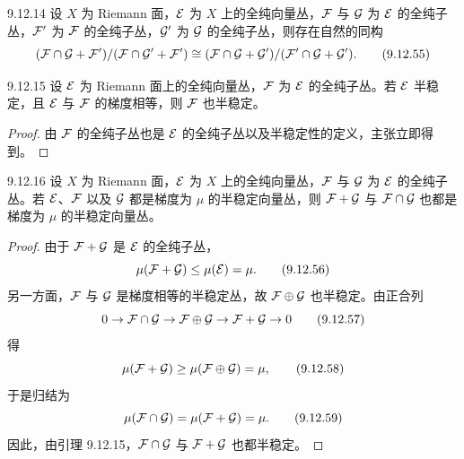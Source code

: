 \begin{corollary}{9.12.14}
  设 $X$ 为 Riemann 面，$\mathcal{E}$ 为 $X$ 上的全纯向量丛，$\mathcal{F}$ 与 $\mathcal{G}$ 为 $\mathcal{E}$ 的全纯子丛，$\mathcal{F}'$ 为 $\mathcal{F}$ 的全纯子丛，$\mathcal{G}'$ 为 $\mathcal{G}$ 的全纯子丛，则存在自然的同构
  \begin{equation}
    (\mathcal{F}\cap\mathcal{G}+\mathcal{F}')/(\mathcal{F}\cap\mathcal{G}'+\mathcal{F}')\cong(\mathcal{F}\cap\mathcal{G}+\mathcal{G}')/(\mathcal{F}'\cap\mathcal{G}+\mathcal{G}').
    \tag{9.12.55}
  \end{equation}
\end{corollary}

\begin{lemma*}{9.12.15}
  设 $\mathcal{E}$ 为 Riemann 面上的全纯向量丛，$\mathcal{F}$ 为 $\mathcal{E}$ 的全纯子丛。若 $\mathcal{E}$ 半稳定，且 $\mathcal{E}$ 与 $\mathcal{F}$ 的梯度相等，则 $\mathcal{F}$ 也半稳定。
\end{lemma*}
\begin{proof}
  由 $\mathcal{F}$ 的全纯子丛也是 $\mathcal{E}$ 的全纯子丛以及半稳定性的定义，主张立即得到。
\end{proof}

\begin{lemma*}{9.12.16}
  设 $X$ 为 Riemann 面，$\mathcal{E}$ 为 $X$ 上的全纯向量丛，$\mathcal{F}$ 与 $\mathcal{G}$ 为 $\mathcal{E}$ 的全纯子丛。若 $\mathcal{E}$、$\mathcal{F}$ 以及 $\mathcal{G}$ 都是梯度为 $\mu$ 的半稳定向量丛，则 $\mathcal{F}+\mathcal{G}$ 与 $\mathcal{F}\cap\mathcal{G}$ 也都是梯度为 $\mu$ 的半稳定向量丛。
\end{lemma*}
\begin{proof}
  由于 $\mathcal{F}+\mathcal{G}$ 是 $\mathcal{E}$ 的全纯子丛，
  \begin{equation}
    \mu(\mathcal{F}+\mathcal{G})\le\mu(\mathcal{E})=\mu.
    \tag{9.12.56}
  \end{equation}
  另一方面，$\mathcal{F}$ 与 $\mathcal{G}$ 是梯度相等的半稳定丛，故 $\mathcal{F}\oplus\mathcal{G}$ 也半稳定。由正合列
  \begin{equation}
    0\to\mathcal{F}\cap\mathcal{G}\to\mathcal{F}\oplus\mathcal{G}\to\mathcal{F}+\mathcal{G}\to0
    \tag{9.12.57}
  \end{equation}
  得
  \begin{equation}
    \mu(\mathcal{F}+\mathcal{G})\ge\mu(\mathcal{F}\oplus\mathcal{G})=\mu,
    \tag{9.12.58}
  \end{equation}
  于是归结为
  \begin{equation}
    \mu(\mathcal{F}\cap\mathcal{G})=\mu(\mathcal{F}+\mathcal{G})=\mu.
    \tag{9.12.59}
  \end{equation}
  因此，由引理 9.12.15，$\mathcal{F}\cap\mathcal{G}$ 与 $\mathcal{F}+\mathcal{G}$ 也都半稳定。
\end{proof}

